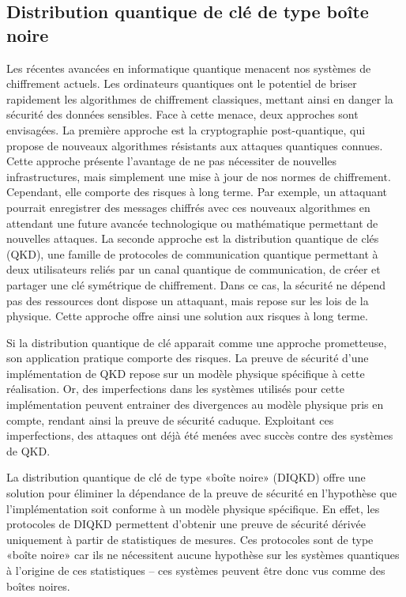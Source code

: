 \subsection{Distribution quantique de clé de type \guillemotleft boîte noire\guillemotright}

Les récentes avancées en informatique quantique menacent nos systèmes de chiffrement actuels. 
Les ordinateurs quantiques ont le potentiel de briser rapidement les algorithmes de chiffrement classiques, mettant ainsi en danger la sécurité des données sensibles. 
Face à cette menace, deux approches sont envisagées. 
La première approche est la cryptographie post-quantique, qui propose de nouveaux algorithmes résistants aux attaques quantiques connues. 
Cette approche présente l'avantage de ne pas nécessiter de nouvelles infrastructures, mais simplement une mise à jour de nos normes de chiffrement. 
Cependant, elle comporte des risques à long terme. 
Par exemple, un attaquant pourrait enregistrer des messages chiffrés avec ces nouveaux algorithmes en attendant une future avancée technologique ou mathématique permettant de nouvelles attaques.
La seconde approche est la distribution quantique de clés (QKD), une famille de protocoles de communication quantique permettant à deux utilisateurs reliés par un canal quantique de communication, de créer et partager une clé symétrique de chiffrement.
Dans ce cas, la sécurité ne dépend pas des ressources dont dispose un attaquant, mais repose sur les lois de la physique. 
Cette approche offre ainsi une solution aux risques à long terme.

\medbreak

Si la distribution quantique de clé apparait comme une approche prometteuse, son application pratique comporte des risques.
La preuve de sécurité d'une implémentation de QKD repose sur un modèle physique spécifique à cette réalisation.
Or, des imperfections dans les systèmes utilisés pour cette implémentation peuvent entrainer des divergences au modèle physique pris en compte, rendant ainsi la preuve de sécurité caduque.
Exploitant ces imperfections, des attaques ont déjà été menées avec succès contre des systèmes de QKD.


\medbreak

La distribution quantique de clé de type «boîte noire» (DIQKD) offre une solution pour éliminer la dépendance de la preuve de sécurité en l'hypothèse que l'implémentation soit conforme à un modèle physique spécifique.
En effet, les protocoles de DIQKD permettent d'obtenir une preuve de sécurité dérivée uniquement à partir de statistiques de mesures.
Ces protocoles sont de type «boîte noire» car ils ne nécessitent aucune hypothèse sur les systèmes quantiques à l'origine de ces statistiques -- ces systèmes peuvent être donc vus comme des boîtes noires.

